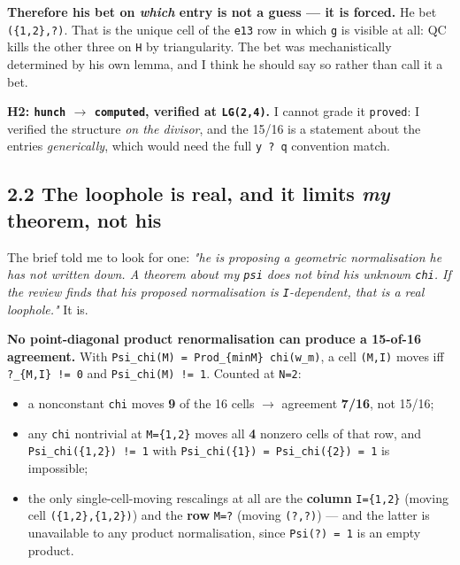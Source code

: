 \documentclass[11pt,a4paper]{article}
\begin{document}
\textbf{Therefore his bet on \emph{which} entry is not a guess --- it is forced.} He bet \mbox{\texttt{(\{1,2\},?)}}. That is the unique cell of the \mbox{\texttt{e13}} row in which \mbox{\texttt{g}} is visible at all: QC kills the other three on \mbox{\texttt{H}} by triangularity. The bet was mechanistically determined by his own lemma, and I think he should say so rather than call it a bet.

\textbf{H2: \mbox{\texttt{hunch}} $\to$ \mbox{\texttt{computed}}, verified at \mbox{\texttt{LG(2,4)}}.} I cannot grade it \mbox{\texttt{proved}}: I verified the structure \emph{on the divisor}, and the 15/16 is a statement about the entries \emph{generically}, which would need the full \mbox{\texttt{y ? q}} convention match.

\subsection*{2.2 The loophole is real, and it limits \emph{my} theorem, not his}

The brief told me to look for one: \emph{"he is proposing a geometric normalisation he has not written down. A theorem about my \mbox{\texttt{psi}} does not bind his unknown \mbox{\texttt{chi}}. If the review finds that his proposed normalisation is \mbox{\texttt{I}}-dependent, that is a real loophole."} It is.

\textbf{No point-diagonal product renormalisation can produce a 15-of-16 agreement.} With \mbox{\texttt{Psi\_chi(M) = Prod\_\{minM\} chi(w\_m)}}, a cell \mbox{\texttt{(M,I)}} moves iff \mbox{\texttt{?\_\{M,I\} != 0}} and \mbox{\texttt{Psi\_chi(M) != 1}}. Counted at \mbox{\texttt{N=2}}:

\begin{itemize}
\item a nonconstant \mbox{\texttt{chi}} moves \textbf{9} of the 16 cells $\to$ agreement \textbf{7/16}, not 15/16;
\item any \mbox{\texttt{chi}} nontrivial at \mbox{\texttt{M=\{1,2\}}} moves all \textbf{4} nonzero cells of that row, and \mbox{\texttt{Psi\_chi(\{1,2\}) != 1}} with \mbox{\texttt{Psi\_chi(\{1\}) = Psi\_chi(\{2\}) = 1}} is impossible;
\item the only single-cell-moving rescalings at all are the \textbf{column} \mbox{\texttt{I=\{1,2\}}} (moving cell \mbox{\texttt{(\{1,2\},\{1,2\})}}) and the \textbf{row} \mbox{\texttt{M=?}} (moving \mbox{\texttt{(?,?)}}) --- and the latter is unavailable to any product normalisation, since \mbox{\texttt{Psi(?) = 1}} is an empty product.
\end{itemize}
\end{document}
